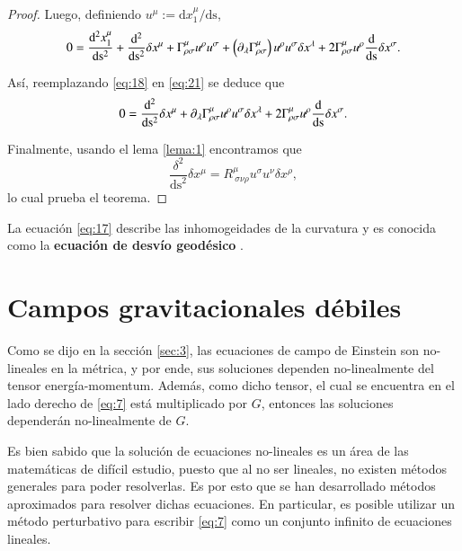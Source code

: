 \begin{proof}
Luego, definiendo $u^{\mu} := \mathrm{d} x^{\mu}_1 / \mathrm{ds}$,
\begin{equation}
\label{eq:21}
0 = \dv[2]{x_1^{\mu}}{\mathrm{s}} + \dv[2]{ }{\mathrm{s}} \delta x^{\mu} + \Gamma^{\mu}_{\rho \sigma} u^{\rho} u^{\sigma} + \left( \partial_{\lambda} \Gamma^{\mu}_{\rho \sigma} \right) u^{\rho} u^{\sigma} \delta x^{\lambda} + 2 \Gamma^{\mu}_{\rho \sigma} u^{\rho} \dv{ }{\mathrm{s}} \delta x^{\sigma}. 
\end{equation}

Así, reemplazando \eqref{eq:18} en \eqref{eq:21} se deduce que
\begin{equation}
0 = \dv[2]{ }{\mathrm{s}} \delta x^{\mu} + \partial_{\lambda} \Gamma^{\mu}_{\rho \sigma} u^{\rho} u^{\sigma} \delta x^{\lambda} + 2 \Gamma^{\mu}_{\rho \sigma} u^{\rho} \dv{ }{\mathrm{s}} \delta x^{\sigma}.
\end{equation}

Finalmente, usando el lema \ref{lema:1} encontramos que
\begin{equation}
\frac{\delta^2}{\mathrm{ds}^2}\delta x^{\mu} = R^{\mu}_{\ \sigma \nu \rho} u^{\sigma} u^{\nu} \delta x^{\rho},
\end{equation}
lo cual prueba el teorema.
\end{proof}

La ecuación \eqref{eq:17} describe las inhomogeidades de la curvatura y es conocida como la \textbf{ecuación de desvío geodésico} \cite{Ciufolini}.

\section{Campos gravitacionales débiles}

Como se dijo en la sección \ref{sec:3}, las ecuaciones de campo de Einstein son no-lineales en la métrica, y por ende, sus soluciones dependen no-linealmente del tensor energía-momentum. Además, como dicho tensor, el cual se encuentra en el lado derecho de \eqref{eq:7} está multiplicado por $G$, entonces las soluciones dependerán no-linealmente de $G$.

Es bien sabido que la solución de ecuaciones no-lineales es un área de las matemáticas de difícil estudio, puesto que al no ser lineales, no existen métodos generales para poder resolverlas. Es por esto que se han desarrollado métodos aproximados para resolver dichas ecuaciones. En particular, es posible utilizar un método perturbativo para escribir \eqref{eq:7} como un conjunto infinito de ecuaciones lineales.

